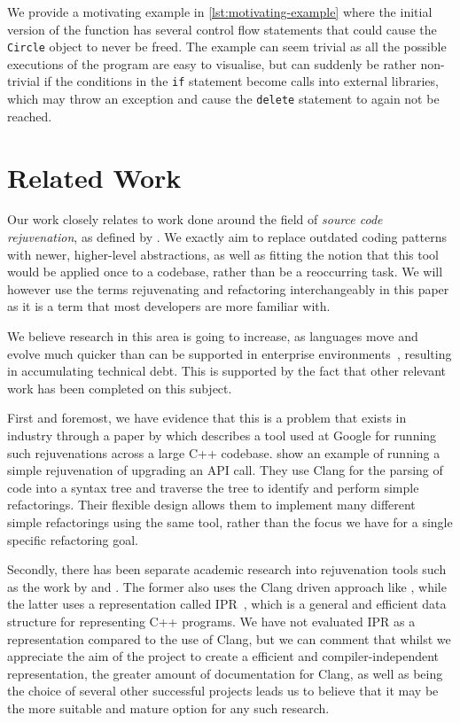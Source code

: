 \documentclass{mpaper}
\begin{document}
    We provide a motivating example in \autoref{lst:motivating-example} where the initial version of the function has several control flow statements that could cause the \texttt{Circle} object to never be freed.
    The example can seem trivial as all the possible executions of the program are easy to visualise, but can suddenly be rather non-trivial if the conditions in the \texttt{if} statement become calls into external libraries, which may throw an exception and cause the \texttt{delete} statement to again not be reached.

    


    \section{Related Work}\label{sec:related-work}
    
    Our work closely relates to work done around the field of \emph{source code rejuvenation}, as defined by \citet{Pirkelbauer2010}. 
    We exactly aim to replace outdated coding patterns with newer, higher-level abstractions, as well as fitting the notion that this tool would be applied once to a codebase, rather than be a reoccurring task.
    We will however use the terms rejuvenating and refactoring interchangeably in this paper as it is a term that most developers are more familiar with.
    
    We believe research in this area is going to increase, as languages move and evolve much quicker than can be supported in enterprise environments~\cite{Overbey2009, Favre2005}, resulting in accumulating technical debt. 
    This is supported by the fact that other relevant work has been completed on this subject.
    
    First and foremost, we have evidence that this is a problem that exists in industry through a paper by \citet{Wright2013} which describes a tool used at Google for running such rejuvenations across a large C++ codebase. 
    \citet{Wright2013} show an example of running a simple rejuvenation of upgrading an API call.
    They use Clang for the parsing of code into a syntax tree and traverse the tree to identify and perform simple refactorings.
    Their flexible design allows them to implement many different simple refactorings using the same tool, rather than the focus we have for a single specific refactoring goal.

    Secondly, there has been separate academic research into rejuvenation tools such as the work by \citet{Huck2016} and \citet{Kumar2012}.
    The former also uses the Clang driven approach like \citet{Wright2013}, while the latter uses a representation called IPR~\cite{Dos2011}, which is a general and efficient data structure for representing C++ programs.
    We have not evaluated IPR as a representation compared to the use of Clang, but we can  comment that whilst we appreciate the aim of the project to create a efficient and compiler-independent representation, the greater amount of documentation for Clang, as well as being the choice of several other successful projects leads us to believe that it may be the more suitable and mature option for any such research.
    
\end{document}
